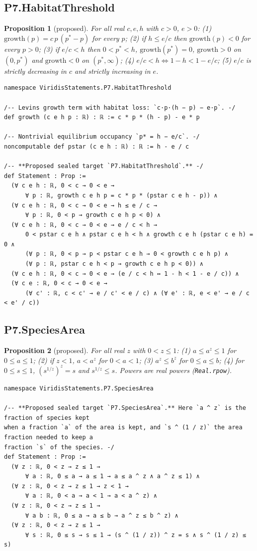 \documentclass[11pt]{article}
\newtheorem{proposition}{Proposition}
\begin{document}
\subsection{P7.HabitatThreshold}
\begin{proposition}[proposed]
For all real $c,e,h$ with $c>0$, $e>0$: (1) $\mathrm{growth}(p)=c\,p\,(p^*-p)$ for every $p$;
(2) if $h\le e/c$ then $\mathrm{growth}(p)<0$ for every $p>0$; (3) if $e/c<h$ then $0<p^*<h$,
$\mathrm{growth}(p^*)=0$, $\mathrm{growth}>0$ on $(0,p^*)$ and $\mathrm{growth}<0$ on $(p^*,\infty)$;
(4) $e/c<h\iff 1-h<1-e/c$; (5) $e/c$ is strictly decreasing in $c$ and strictly increasing in $e$.
\end{proposition}
\begin{lstlisting}
namespace ViridisStatements.P7.HabitatThreshold

/-- Levins growth term with habitat loss: `c·p·(h − p) − e·p`. -/
def growth (c e h p : ℝ) : ℝ := c * p * (h - p) - e * p

/-- Nontrivial equilibrium occupancy `p* = h − e/c`. -/
noncomputable def pstar (c e h : ℝ) : ℝ := h - e / c

/-- **Proposed sealed target `P7.HabitatThreshold`.** -/
def Statement : Prop :=
  (∀ c e h : ℝ, 0 < c → 0 < e →
      ∀ p : ℝ, growth c e h p = c * p * (pstar c e h - p)) ∧
  (∀ c e h : ℝ, 0 < c → 0 < e → h ≤ e / c →
      ∀ p : ℝ, 0 < p → growth c e h p < 0) ∧
  (∀ c e h : ℝ, 0 < c → 0 < e → e / c < h →
      0 < pstar c e h ∧ pstar c e h < h ∧ growth c e h (pstar c e h) = 0 ∧
      (∀ p : ℝ, 0 < p → p < pstar c e h → 0 < growth c e h p) ∧
      (∀ p : ℝ, pstar c e h < p → growth c e h p < 0)) ∧
  (∀ c e h : ℝ, 0 < c → 0 < e → (e / c < h ↔ 1 - h < 1 - e / c)) ∧
  (∀ c e : ℝ, 0 < c → 0 < e →
      (∀ c' : ℝ, c < c' → e / c' < e / c) ∧ (∀ e' : ℝ, e < e' → e / c < e' / c))
\end{lstlisting}

\subsection{P7.SpeciesArea}
\begin{proposition}[proposed]
For all real $z$ with $0<z\le1$: (1) $a\le a^z\le1$ for $0\le a\le1$; (2) if $z<1$, $a<a^z$ for
$0<a<1$; (3) $a^z\le b^z$ for $0\le a\le b$; (4) for $0\le s\le1$, $(s^{1/z})^z=s$ and
$s^{1/z}\le s$. Powers are real powers (\texttt{Real.rpow}).
\end{proposition}
\begin{lstlisting}
namespace ViridisStatements.P7.SpeciesArea

/-- **Proposed sealed target `P7.SpeciesArea`.** Here `a ^ z` is the fraction of species kept
when a fraction `a` of the area is kept, and `s ^ (1 / z)` the area fraction needed to keep a
fraction `s` of the species. -/
def Statement : Prop :=
  (∀ z : ℝ, 0 < z → z ≤ 1 →
      ∀ a : ℝ, 0 ≤ a → a ≤ 1 → a ≤ a ^ z ∧ a ^ z ≤ 1) ∧
  (∀ z : ℝ, 0 < z → z ≤ 1 → z < 1 →
      ∀ a : ℝ, 0 < a → a < 1 → a < a ^ z) ∧
  (∀ z : ℝ, 0 < z → z ≤ 1 →
      ∀ a b : ℝ, 0 ≤ a → a ≤ b → a ^ z ≤ b ^ z) ∧
  (∀ z : ℝ, 0 < z → z ≤ 1 →
      ∀ s : ℝ, 0 ≤ s → s ≤ 1 → (s ^ (1 / z)) ^ z = s ∧ s ^ (1 / z) ≤ s)
\end{lstlisting}
\end{document}
